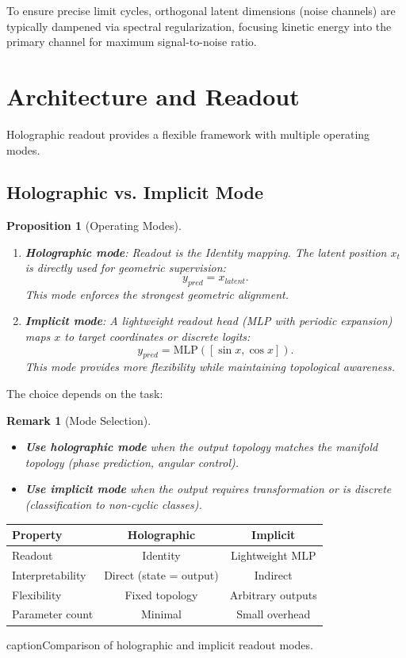 \documentclass[12pt,letterpaper,twoside]{article}
\newtheorem{remarque}{Remark}[section]
\newtheorem{prop}{Proposition}[section]
\begin{document}
To ensure precise limit cycles, orthogonal latent dimensions (noise channels) are typically dampened via spectral regularization, focusing kinetic energy into the primary channel for maximum signal-to-noise ratio.

\section{Architecture and Readout}

Holographic readout provides a flexible framework with multiple operating modes.

\subsection{Holographic vs. Implicit Mode}

\begin{prop}[Operating Modes]
\begin{enumerate}
\item \textbf{Holographic mode}: Readout is the Identity mapping. The latent position $x_t$ is directly used for geometric supervision:
\[
y_{pred} = x_{latent}.
\]
This mode enforces the strongest geometric alignment.

\item \textbf{Implicit mode}: A lightweight readout head (MLP with periodic expansion) maps $x$ to target coordinates or discrete logits:
\[
y_{pred} = \text{MLP}([\sin x, \cos x]).
\]
This mode provides more flexibility while maintaining topological awareness.
\end{enumerate}
\end{prop}

The choice depends on the task:

\begin{remarque}[Mode Selection]
\begin{itemize}
\item \textbf{Use holographic mode} when the output topology matches the manifold topology (phase prediction, angular control).
\item \textbf{Use implicit mode} when the output requires transformation or is discrete (classification to non-cyclic classes).
\end{itemize}
\end{remarque}

\begin{table}[htbp]
\centering
\begin{tabular}{lcc}
\toprule
Property & Holographic & Implicit \\ \midrule
Readout & Identity & Lightweight MLP \\
Interpretability & Direct (state = output) & Indirect \\
Flexibility & Fixed topology & Arbitrary outputs \\
Parameter count & Minimal & Small overhead \\ \bottomrule
\end{tabular}
caption{Comparison of holographic and implicit readout modes.}
\label{tab:readout-modes}
\end{table}
\end{document}
